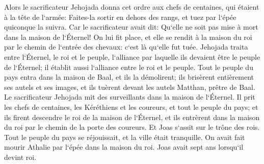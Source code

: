 \verse Alors le sacrificateur Jehojada donna cet ordre aux chefs de centaines, qui étaient à la tête de l`armée: Faites-la sortir en dehors des rangs, et tuez par l`épée quiconque la suivra. Car le sacrificateur avait dit: Qu`elle ne soit pas mise à mort dans la maison de l`Éternel! 
\verse On lui fit place, et elle se rendit à la maison du roi par le chemin de l`entrée des chevaux: c`est là qu`elle fut tuée. 
\verse Jehojada traita entre l`Éternel, le roi et le peuple, l`alliance par laquelle ils devaient être le peuple de l`Éternel; il établit aussi l`alliance entre le roi et le peuple. 
\verse Tout le peuple du pays entra dans la maison de Baal, et ils la démolirent; ils brisèrent entièrement ses autels et ses images, et ils tuèrent devant les autels Matthan, prêtre de Baal. Le sacrificateur Jehojada mit des surveillants dans la maison de l`Éternel. 
\verse Il prit les chefs de centaines, les Kéréthiens et les coureurs, et tout le peuple du pays; et ils firent descendre le roi de la maison de l`Éternel, et ils entrèrent dans la maison du roi par le chemin de la porte des coureurs. Et Joas s`assit sur le trône des rois. 
\verse Tout le peuple du pays se réjouissait, et la ville était tranquille. On avait fait mourir Athalie par l`épée dans la maison du roi. 
\verse Joas avait sept ans lorsqu`il devint roi. 

\chapter{}

